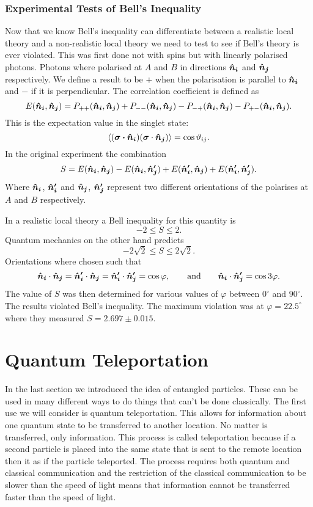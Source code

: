     \subsubsection{Experimental Tests of Bell's Inequality}
    Now that we know Bell's inequality can differentiate between a realistic local theory and a non-realistic local theory we need to test to see if Bell's theory is ever violated.
    This was first done not with spins but with linearly polarised photons.
    Photons where polarised at \(A\) and \(B\) in directions \(\bm{\hat{n}}\bm{_i}\) and \(\bm{\hat{n}}\bm{_j}\) respectively.
    We define a result to be \(+\) when the polarisation is parallel to \(\bm{\hat{n}}\bm{_i}\) and \(-\) if it is perpendicular.
    The correlation coefficient is defined as
    \[E(\bm{\hat{n}}\bm{_i}, \bm{\hat{n}}\bm{_j}) = P_{++}(\bm{\hat{n}}\bm{_i}, \bm{\hat{n}}\bm{_j}) + P_{--}(\bm{\hat{n}}\bm{_i}, \bm{\hat{n}}\bm{_j}) - P_{-+}(\bm{\hat{n}}\bm{_i}, \bm{\hat{n}}\bm{_j}) - P_{+-}(\bm{\hat{n}}\bm{_i}, \bm{\hat{n}}\bm{_j}).\]
    This is the expectation value in the singlet state:
    \[\langle{(\bm{\sigma\cdot\bm{\hat{n}}\bm{_i}})(\bm{\sigma}\cdot\bm{\hat{n}}\bm{_j})}\rangle = \cos\vartheta_{ij}.\]
    In the original experiment the combination
    \[S = E(\bm{\hat{n}}\bm{_i}, \bm{\hat{n}}\bm{_j}) - E(\bm{\hat{n}}\bm{_i}, \bm{\hat{n}}\bm{'_j}) + E(\bm{\hat{n}}\bm{'_i}, \bm{\hat{n}}\bm{_j}) + E(\bm{\hat{n}}\bm{'_i}, \bm{\hat{n}}\bm{'_j}).\]
    Where \(\bm{\hat{n}}\bm{_i}\), \(\bm{\hat{n}}\bm{'_i}\) and \(\bm{\hat{n}}\bm{_j}\), \(\bm{\hat{n}}\bm{'_j}\) represent two different orientations of the polarises at \(A\) and \(B\) respectively.
    
    In a realistic local theory a Bell inequality for this quantity is
    \[-2 \le S \le 2.\]
    Quantum mechanics on the other hand predicts
    \[-2\sqrt{2} \le S \le 2\sqrt{2}.\]
    Orientations where chosen such that
    \[\bm{\hat{n}}\bm{_i}\cdot\bm{\hat{n}}\bm{_j} = \bm{\hat{n}}\bm{'_i}\cdot\bm{\hat{n}}\bm{_j} = \bm{\hat{n}}\bm{'_i}\cdot\bm{\hat{n}}\bm{'_j} = \cos\varphi, \qquad\text{and}\qquad \bm{\hat{n}}\bm{_i}\cdot\bm{\hat{n}}\bm{'_j} = \cos3\varphi.\]
    The value of \(S\) was then determined for various values of \(\varphi\) between \(0^\circ\) and \(90^\circ\).
    The results violated Bell's inequality.
    The maximum violation was at \(\varphi = 22.5^\circ\) where they measured \(S = 2.697 \pm 0.015\).
    
    \section{Quantum Teleportation}
    In the last section we introduced the idea of entangled particles.
    These can be used in many different ways to do things that can't be done classically.
    The first use we will consider is quantum teleportation.
    This allows for information about one quantum state to be transferred to another location.
    No matter is transferred, only information.
    This process is called teleportation because if a second particle is placed into the same state that is sent to the remote location then it as if the particle teleported.
    The process requires both quantum and classical communication and the restriction of the classical communication to be slower than the speed of light means that information cannot be transferred faster than the speed of light.
    
